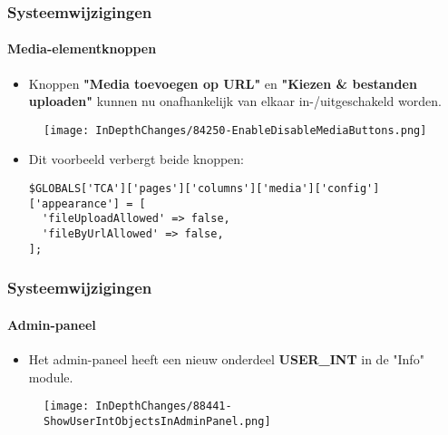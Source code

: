 
\begin{frame}[fragile]
	\frametitle{Systeemwijzigingen}
	\framesubtitle{Media-elementknoppen}

	\lstset{basicstyle=\tiny\ttfamily}

	\begin{itemize}
		\item Knoppen \textbf{"Media toevoegen op URL"} en \textbf{"Kiezen \& bestanden uploaden"}
			kunnen nu onafhankelijk van elkaar in-/uitgeschakeld worden.
	\end{itemize}

	\begin{figure}
		\texttt{[image: InDepthChanges/84250-EnableDisableMediaButtons.png]}
	\end{figure}

	\begin{itemize}
		\item Dit voorbeeld verbergt beide knoppen:
\begin{lstlisting}
$GLOBALS['TCA']['pages']['columns']['media']['config']['appearance'] = [
  'fileUploadAllowed' => false,
  'fileByUrlAllowed' => false,
];
\end{lstlisting}

	\end{itemize}

\end{frame}


\begin{frame}[fragile]
	\frametitle{Systeemwijzigingen}
	\framesubtitle{Admin-paneel}

	\begin{itemize}
		\item Het admin-paneel heeft een nieuw onderdeel \textbf{USER\_INT} in de "Info" module.
	\end{itemize}

	\begin{figure}
		\texttt{[image: InDepthChanges/88441-ShowUserIntObjectsInAdminPanel.png]}
	\end{figure}

\end{frame}

